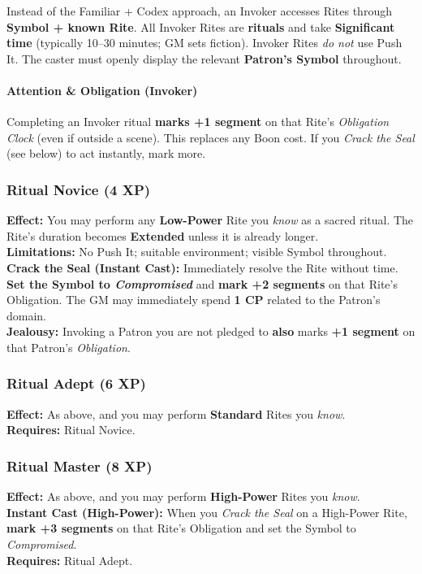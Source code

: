 \documentclass[12pt,twoside]{book}
\begin{document}
Instead of the Familiar + Codex approach, an Invoker accesses Rites through \textbf{Symbol + known Rite}. All Invoker Rites are \textbf{rituals} and take \textbf{Significant time} (typically 10–30 minutes; GM sets fiction). Invoker Rites \emph{do not} use Push It. The caster must openly display the relevant \textbf{Patron’s Symbol} throughout.

\paragraph{Attention \& Obligation (Invoker)}
Completing an Invoker ritual \textbf{marks +1 segment} on that Rite’s \emph{Obligation Clock} (even if outside a scene). This replaces any Boon cost. If you \emph{Crack the Seal} (see below) to act instantly, mark more.

\subsubsection*{Ritual Novice (4 XP)}
\textbf{Effect:} You may perform any \textbf{Low-Power} Rite you \emph{know} as a sacred ritual. The Rite’s duration becomes \textbf{Extended} unless it is already longer.\\
\textbf{Limitations:} No Push It; suitable environment; visible Symbol throughout.\\
\textbf{Crack the Seal (Instant Cast):} Immediately resolve the Rite without time. \textbf{Set the Symbol to \emph{Compromised}} and \textbf{mark +2 segments} on that Rite’s Obligation. The GM may immediately spend \textbf{1 CP} related to the Patron’s domain.\\
\textbf{Jealousy:} Invoking a Patron you are not pledged to \textbf{also} marks \textbf{+1 segment} on that Patron’s \emph{Obligation}.

\subsubsection*{Ritual Adept (6 XP)} 
\textbf{Effect:} As above, and you may perform \textbf{Standard} Rites you \emph{know}.\\
\textbf{Requires:} Ritual Novice.

\subsubsection*{Ritual Master (8 XP)} 
\textbf{Effect:} As above, and you may perform \textbf{High-Power} Rites you \emph{know}.\\
\textbf{Instant Cast (High-Power):} When you \emph{Crack the Seal} on a High-Power Rite, \textbf{mark +3 segments} on that Rite’s Obligation and set the Symbol to \emph{Compromised}.\\
\textbf{Requires:} Ritual Adept.
\end{document}
